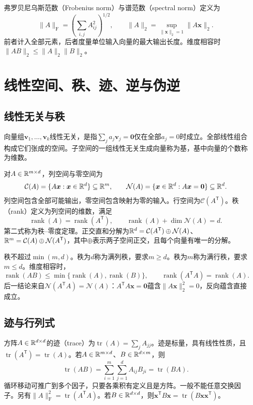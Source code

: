 弗罗贝尼乌斯范数（Frobenius norm）与谱范数（spectral norm）定义为
\begin{equation}
 \|A\|_{\mathrm F}=\left(\sum_{i,j}A_{ij}^2\right)^{1/2},\qquad
 \|A\|_2=\sup_{\|\bm x\|_2=1}\|A\bm x\|_2.
\end{equation}
前者计入全部元素，后者度量单位输入向量的最大输出长度。维度相容时$\|AB\|_2\leq\|A\|_2\|B\|_2$。

\section{线性空间、秩、迹、逆与伪逆}
\subsection{线性无关与秩}
向量组$\bm v_1,\ldots,\bm v_k$线性无关，是指$\sum_j a_j\bm v_j=\bm0$仅在全部$a_j=0$时成立。全部线性组合构成它们张成的空间。子空间的一组线性无关生成向量称为基，基中向量的个数称为维数。

对$A\in\mathbb{R}^{m\times d}$，列空间与零空间为
\begin{equation}
 \mathcal C(A)=\{A\bm x:\bm x\in\mathbb{R}^d\}\subseteq\mathbb{R}^m,\qquad
 \mathcal N(A)=\{\bm x\in\mathbb{R}^d:A\bm x=\bm0\}\subseteq\mathbb{R}^d.
\end{equation}
列空间包含全部可能输出，零空间包含映射为零的输入。行空间为$\mathcal C(A^{\mathsf T})$。秩（rank）定义为列空间的维数，满足
\begin{equation}
 \operatorname{rank}(A)=\operatorname{rank}(A^{\mathsf T}),\qquad
 \operatorname{rank}(A)+\dim\mathcal N(A)=d.
\end{equation}
第二式称为秩--零度定理。正交直和分解为$\mathbb{R}^d=\mathcal C(A^{\mathsf T})\oplus\mathcal N(A)$、$\mathbb{R}^m=\mathcal C(A)\oplus\mathcal N(A^{\mathsf T})$，其中$\oplus$表示两子空间正交，且每个向量有唯一的分解。

秩不超过$\min(m,d)$。秩为$d$称为满列秩，要求$m\geq d$。秩为$m$称为满行秩，要求$m\leq d$。维度相容时，
\begin{equation}
 \operatorname{rank}(AB)\leq\min\{\operatorname{rank}(A),\operatorname{rank}(B)\},\qquad
 \operatorname{rank}(A^{\mathsf T}A)=\operatorname{rank}(A).
\end{equation}
后一结论来自$\mathcal N(A^{\mathsf T}A)=\mathcal N(A)$：$A^{\mathsf T}A\bm x=\bm0$蕴含$\|A\bm x\|_2^2=0$，反向蕴含直接成立。

\subsection{迹与行列式}
方阵$A\in\mathbb{R}^{d\times d}$的迹（trace）为$\operatorname{tr}(A)=\sum_jA_{jj}$。迹是标量，具有线性性质，且$\operatorname{tr}(A^{\mathsf T})=\operatorname{tr}(A)$。若$A\in\mathbb{R}^{m\times d}$、$B\in\mathbb{R}^{d\times m}$，则
\begin{equation}
 \operatorname{tr}(AB)=\sum_{i=1}^m\sum_{j=1}^dA_{ij}B_{ji}=\operatorname{tr}(BA).
\end{equation}
循环移动可推广到多个因子，只要各乘积有定义且是方阵。一般不能任意交换因子。另有$\|A\|_{\mathrm F}^2=\operatorname{tr}(A^{\mathsf T}A)$。若$B\in\mathbb{R}^{d\times d}$，则$\bm x^{\mathsf T}B\bm x=\operatorname{tr}(B\bm x\bm x^{\mathsf T})$。

